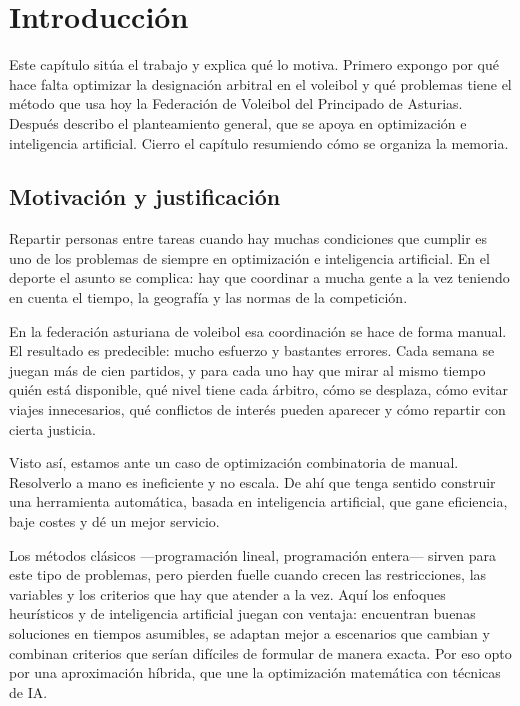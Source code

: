 \documentclass[11pt,a4paper,spanish]{book}
\numberwithin{equation}{chapter}
\numberwithin{figure}{chapter}
\numberwithin{table}{chapter}
\begin{document}
\mainmatter
\chapter{Introducción}

Este capítulo sitúa el trabajo y explica qué lo motiva. Primero expongo por qué hace falta optimizar la designación arbitral en el voleibol y qué problemas tiene el método que usa hoy la Federación de Voleibol del Principado de Asturias. Después describo el planteamiento general, que se apoya en optimización e inteligencia artificial. Cierro el capítulo resumiendo cómo se organiza la memoria.

\section{Motivación y justificación}

Repartir personas entre tareas cuando hay muchas condiciones que cumplir es uno de los problemas de siempre en optimización e inteligencia artificial. En el deporte el asunto se complica: hay que coordinar a mucha gente a la vez teniendo en cuenta el tiempo, la geografía y las normas de la competición.

En la federación asturiana de voleibol esa coordinación se hace de forma manual. El resultado es predecible: mucho esfuerzo y bastantes errores. Cada semana se juegan más de cien partidos, y para cada uno hay que mirar al mismo tiempo quién está disponible, qué nivel tiene cada árbitro, cómo se desplaza, cómo evitar viajes innecesarios, qué conflictos de interés pueden aparecer y cómo repartir con cierta justicia.

Visto así, estamos ante un caso de optimización combinatoria de manual. Resolverlo a mano es ineficiente y no escala. De ahí que tenga sentido construir una herramienta automática, basada en inteligencia artificial, que gane eficiencia, baje costes y dé un mejor servicio.

Los métodos clásicos —programación lineal, programación entera— sirven para este tipo de problemas, pero pierden fuelle cuando crecen las restricciones, las variables y los criterios que hay que atender a la vez. Aquí los enfoques heurísticos y de inteligencia artificial juegan con ventaja: encuentran buenas soluciones en tiempos asumibles, se adaptan mejor a escenarios que cambian y combinan criterios que serían difíciles de formular de manera exacta. Por eso opto por una aproximación híbrida, que une la optimización matemática con técnicas de IA.
\end{document}
